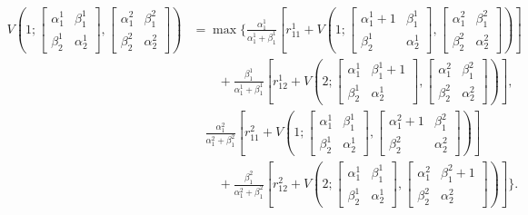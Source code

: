 \begin{align*}
    V\left(1; \begin{bmatrix} \alpha_1^1& \beta_1^1\\\beta_2^1& \alpha_2^1 \end{bmatrix}, \begin{bmatrix} \alpha_1^2& \beta_1^2\\\beta_2^2& \alpha_2^2 \end{bmatrix}\right) &= 
    \max \Bigg\{ 
    \frac{\alpha_1^1}{\alpha_1^1 + \beta_1^1} \left[ r_{11}^1 + V\left(1; \begin{bmatrix} \alpha_1^1 + 1& \beta_1^1\\\beta_2^1& \alpha_2^1 \end{bmatrix}, \begin{bmatrix} \alpha_1^2& \beta_1^2\\\beta_2^2& \alpha_2^2 \end{bmatrix}\right) \right]  \\
    &\quad\quad + \frac{\beta_1^1}{\alpha_1^1 + \beta_1^1} \left[r_{12}^1 + V\left(2; \begin{bmatrix} \alpha_1^1 & \beta_1^1 + 1\\\beta_2^1& \alpha_2^1 \end{bmatrix}, \begin{bmatrix} \alpha_1^2& \beta_1^2\\\beta_2^2& \alpha_2^2 \end{bmatrix}\right) \right] , \\ 
    &\quad\frac{\alpha_1^2}{\alpha_1^2 + \beta_1^2} \left[ r_{11}^2 + V\left(1; \begin{bmatrix} \alpha_1^1 & \beta_1^1 \\\beta_2^1& \alpha_2^1 \end{bmatrix}, \begin{bmatrix} \alpha_1^2 + 1& \beta_1^2\\\beta_2^2& \alpha_2^2 \end{bmatrix}\right) \right]  \\
    &\quad\quad + \frac{\beta_1^2}{\alpha_1^2 + \beta_1^2} \left[r_{12}^2 + V\left(2; \begin{bmatrix} \alpha_1^1 & \beta_1^1 \\\beta_2^1& \alpha_2^1 \end{bmatrix}, \begin{bmatrix} \alpha_1^2& \beta_1^2 + 1\\\beta_2^2& \alpha_2^2 \end{bmatrix}\right) \right] 
    \Bigg\} .
\end{align*}
